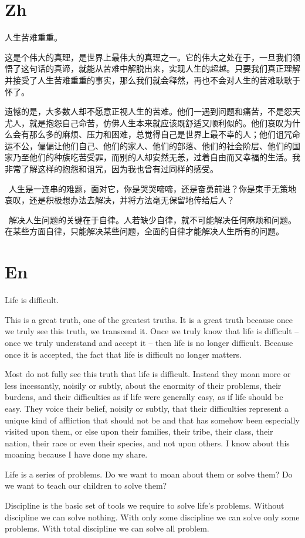 \documentclass[UTF8]{article}
\begin{document}
\section{Zh}
人生苦难重重。

这是个伟大的真理，是世界上最伟大的真理之一。它的伟大之处在于，一旦我们领悟了这句话的真谛，就能从苦难中解脱出来，实现人生的超越。只要我们真正理解并接受了人生苦难重重的事实，那么我们就会释然，再也不会对人生的苦难耿耿于怀了。

遗憾的是，大多数人却不愿意正视人生的苦难。他们一遇到问题和痛苦，不是怨天尤人，就是抱怨自己命苦，仿佛人生本来就应该既舒适又顺利似的。他们哀叹为什么会有那么多的麻烦、压力和困难，总觉得自己是世界上最不幸的人；他们诅咒命运不公，偏偏让他们自己、他们的家人、他们的部落、他们的社会阶层、他们的国家乃至他们的种族吃苦受罪，而别的人却安然无恙，过着自由而又幸福的生活。我非常了解这样的抱怨和诅咒，因为我也曾有过同样的感受。

 人生是一连串的难题，面对它，你是哭哭啼啼，还是奋勇前进？你是束手无策地哀叹，还是积极想办法去解决，并将方法毫无保留地传给后人？

 解决人生问题的关键在于自律。人若缺少自律，就不可能解决任何麻烦和问题。在某些方面自律，只能解决某些问题，全面的自律才能解决人生所有的问题。
\section{En}

Life is difficult.

This is a great truth, one of the greatest truths. It is a great truth because once we truly see this truth, we transcend it. Once we truly know that life is difficult -- once we truly understand and accept it -- then life is no longer difficult. Because once it is accepted, the fact that life is difficult no longer matters.

Most do not fully see this truth that life is difficult. Instead they moan more or less incessantly, noisily or subtly, about the enormity of their problems, their burdens, and their difficulties as if life were generally easy, as if life should be easy. They voice their belief, noisily or subtly, that their difficulties represent a unique kind of affliction that should not be and that has somehow been especially visited upon them, or else upon their families, their tribe, their class, their nation, their race or even their species, and not upon others. I know about this moaning because I have done my share.

Life is a series of problems. Do we want to moan about them or solve them? Do we want to teach our children to solve them?

Discipline is the basic set of tools we require to solve life's problems. Without discipline we can solve nothing. With only some discipline we can solve only some problems. With total discipline we can solve all problem.
\end{document}
